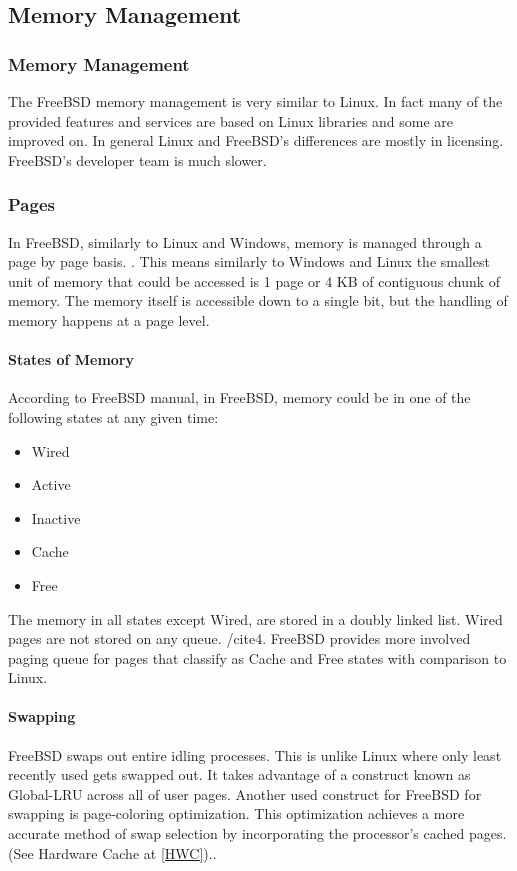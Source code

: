 \documentclass[journal,10pt,onecolumn,compsoc,letterpaper,draftclsnofoot,table,xcdraw]{IEEEtran} \usepackage[margin=0.75in]{geometry}
\begin{document}
\subsection{Memory Management}
\subsubsection{Memory Management}
\noindent The FreeBSD memory management is very similar to Linux. In fact many of the provided features and services are based on Linux libraries and some are improved on. In general Linux and FreeBSD's differences are mostly in licensing. FreeBSD's developer team is much slower.
\subsubsection{Pages}
\noindent In FreeBSD, similarly to Linux and Windows, memory is managed through a page by page basis. \cite{2-4}. This means similarly to Windows and Linux the smallest unit of memory that could be accessed is 1 page or 4 KB of contiguous chunk of memory. The memory itself is accessible down to a single bit, but the handling of memory happens at a page level.
\paragraph{States of Memory} According to FreeBSD manual, in FreeBSD, memory could be in one of the following states at any given time:
\begin{itemize}
\item Wired
\item Active
\item Inactive
\item Cache
\item Free
\end{itemize}
\noindent The memory in all states except Wired, are stored in a doubly linked list. Wired pages are not stored on any queue. /cite{4}. FreeBSD provides more involved paging queue for pages that classify as Cache and Free states with comparison to Linux.
\paragraph{Swapping} FreeBSD swaps out entire idling processes. This is unlike Linux where only least recently used gets swapped out. It takes advantage of a construct known as Global-LRU across all of user pages. Another used construct for FreeBSD for swapping is page-coloring optimization. This optimization achieves a more accurate method of swap selection by incorporating the processor's cached pages. (See Hardware Cache at \ref{HWC}).\cite{2-5}.
\end{document}
